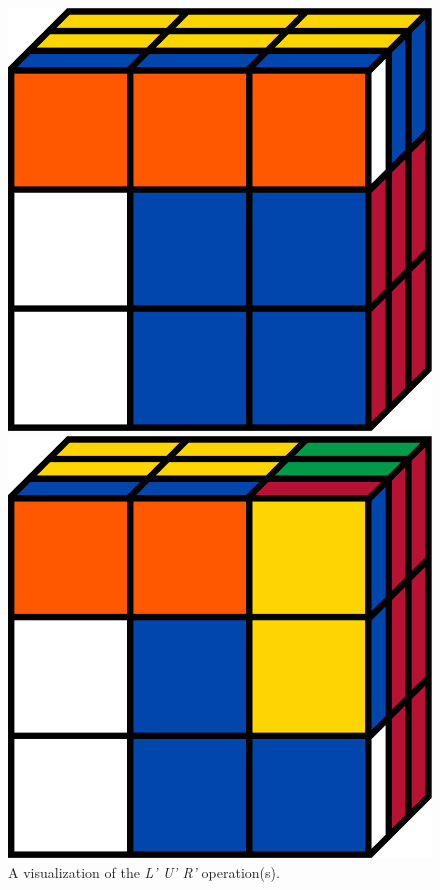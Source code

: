 \documentclass[12pt]{article}
\begin{document}
\begin{figure}[h]
\begin{minipage}[c]{0.2\textwidth}
        \includegraphics[scale=0.1]{moves/cubeLpUp.png}
    \end{minipage}
    \begin{minipage}[c]{0.05\textwidth}
        \centering
    \end{minipage}
    \hspace{0.5cm}
    \begin{minipage}[c]{0.2\textwidth}
        \includegraphics[scale=0.1]{moves/cubeLpUpRp.png}
    \end{minipage}
    \caption{A visualization of the \textit{L' U' R'} operation(s).}
\end{figure}
\end{document}
